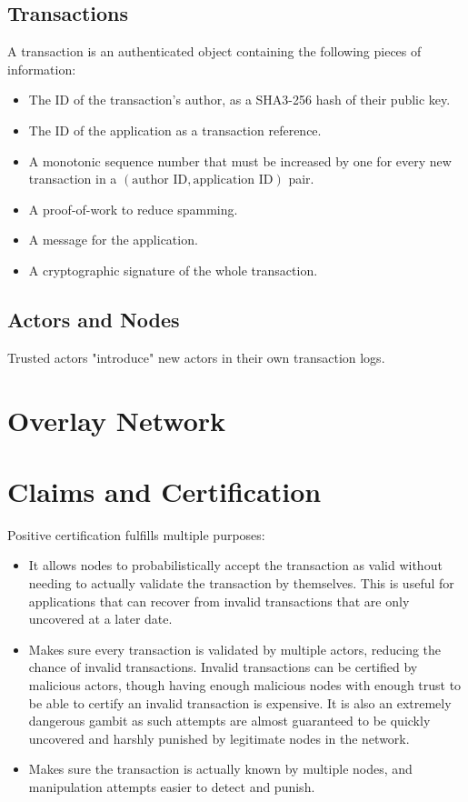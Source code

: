 \documentclass[twocolumn, a4paper]{article}
\begin{document}
\subsection{Transactions}
\label{ssec:transactions}

A transaction is an authenticated object containing the following pieces of information:

\begin{itemize}
    \item The ID of the transaction's author, as a SHA3-256 hash of their public key.
    \item The ID of the application as a transaction reference.
    \item A monotonic sequence number that must be increased by one for every new transaction in a $(\text{author ID}, \text{application ID})$ pair.
    \item A proof-of-work to reduce spamming.
    \item A message for the application.
    \item A cryptographic signature of the whole transaction.
\end{itemize}

\subsection{Actors and Nodes}

Trusted actors "introduce" new actors in their own transaction logs.

\section{Overlay Network}
\label{sec:overlay}

\section{Claims and Certification}

Positive certification fulfills multiple purposes:

\begin{itemize}
    \item It allows nodes to probabilistically accept the transaction as valid without needing to actually validate the transaction by themselves. This is useful for applications that can recover from invalid transactions that are only uncovered at a later date.
    \item Makes sure every transaction is validated by multiple actors, reducing the chance of invalid transactions. Invalid transactions can be certified by malicious actors, though having enough malicious nodes with enough trust to be able to certify an invalid transaction is expensive. It is also an extremely dangerous gambit as such attempts are almost guaranteed to be quickly uncovered and harshly punished by legitimate nodes in the network.
    \item Makes sure the transaction is actually known by multiple nodes, and manipulation attempts easier to detect and punish.
\end{itemize}
\end{document}
